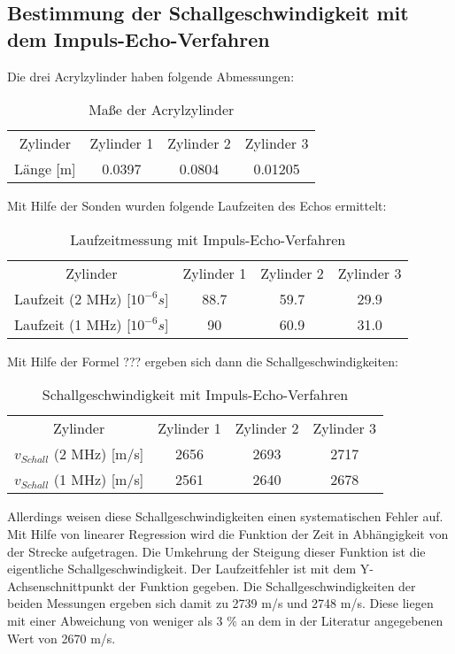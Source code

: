 \documentclass[11pt,ngerman,a4paper]{article}
\begin{document}
\subsection{Bestimmung der Schallgeschwindigkeit mit dem Impuls-Echo-Verfahren}
Die drei Acrylzylinder haben folgende Abmessungen:
 \begin{table}[h]
\centering
 \begin{tabular}{|c||c|c|c|}
 Zylinder & Zylinder 1 & Zylinder 2 & Zylinder 3 \\
  Länge [m] & 0.0397 & 0.0804 & 0.01205 \\
 \end{tabular}
\caption{Maße der Acrylzylinder}
\end{table}
\newline Mit Hilfe der Sonden wurden folgende Laufzeiten des Echos ermittelt:
 \begin{table}[h]
\centering
 \begin{tabular}{|c||c|c|c|}
 Zylinder & Zylinder 1 & Zylinder 2 & Zylinder 3 \\
 Laufzeit (2 MHz) [$10^{-6}s$] & 88.7 & 59.7 & 29.9 \\
 Laufzeit (1 MHz) [$10^{-6}s$] & 90  & 60.9 & 31.0 \\
 \end{tabular}
\caption{Laufzeitmessung mit Impuls-Echo-Verfahren}
\end{table}
\newline
Mit Hilfe der Formel ??? ergeben sich dann die Schallgeschwindigkeiten:
\begin{table}[h]
\centering
 \begin{tabular}{|c||c|c|c|}
 Zylinder & Zylinder 1 & Zylinder 2 & Zylinder 3 \\
 $v_{Schall}$ (2 MHz) [m/s] & 2656 & 2693 & 2717 \\
 $v_{Schall}$ (1 MHz) [m/s] & 2561  & 2640 & 2678 \\
 \end{tabular}
\caption{Schallgeschwindigkeit mit Impuls-Echo-Verfahren}
\end{table}
\newline
Allerdings weisen diese Schallgeschwindigkeiten einen systematischen Fehler auf. Mit Hilfe von linearer Regression wird die Funktion der Zeit in Abhängigkeit von der Strecke aufgetragen. Die Umkehrung der Steigung dieser Funktion ist die eigentliche Schallgeschwindigkeit. Der Laufzeitfehler ist mit dem Y-Achsenschnittpunkt der Funktion gegeben. Die Schallgeschwindigkeiten der beiden Messungen ergeben sich damit zu 2739 m/s und 2748 m/s.
Diese liegen mit einer Abweichung von weniger als 3 \%  an dem in der Literatur angegebenen Wert von 2670 m/s.
\end{document}
